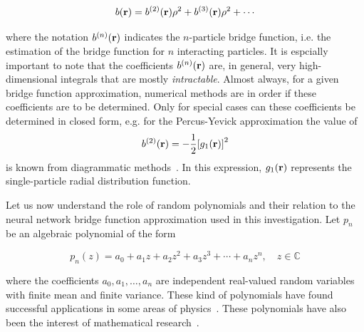 \begin{equation}
    b(\vecr) = b^{(2)}(\vecr) \rho^2 + b^{(3)}(\vecr) \rho^2 + \cdots
    \label{eq:expansion-densidad}
\end{equation}

where the notation $b^{(n)}(\mathbf{r})$ indicates the $n$-particle bridge function, i.e. the
estimation of the bridge function for $n$ interacting particles. It is espcially
important to note that the coefficients $b^{(n)}(\mathbf{r})$ are, in general, very high-dimensional
integrals that are mostly \emph{intractable}. Almost always, for a given bridge function
approximation, numerical methods are in order if these coefficients are to be determined.
Only for special cases can these coefficients be determined in closed form, e.g.
for the Percus-Yevick approximation the value of
\[
b^{(2)}(\mathbf{r}) = -\frac{1}{2}{\left[ g_{1}(\mathbf{r}) \right]}^2
\]
is known from diagrammatic methods~\cite{hansenTheorySimpleLiquids2013}. In this
expression, $g_{1}(\mathbf{r})$ represents the single-particle radial distribution function.

Let us now understand the role of random polynomials and their relation to the neural
network bridge function approximation used in this investigation.
Let $p_n$ be an algebraic polynomial of the form

\begin{equation}
    p_n(z) = a_0 + a_1 z + a_2 z^2 + a_3 z^3 + \cdots + a_n z^n, \quad
    z \in \mathbb{C}
    \label{eq:random-poly}
\end{equation}

where the coefficients $a_0, a_1, \dots , a_n$ are independent real-valued random variables
with finite mean and finite variance. These kind of polynomials have found successful
applications in some areas of physics~\cite{houghZerosGaussianAnalytic2009}.
These polynomials have also been the interest of mathematical research~\cite{edelmanHowManyZeros1995}.

